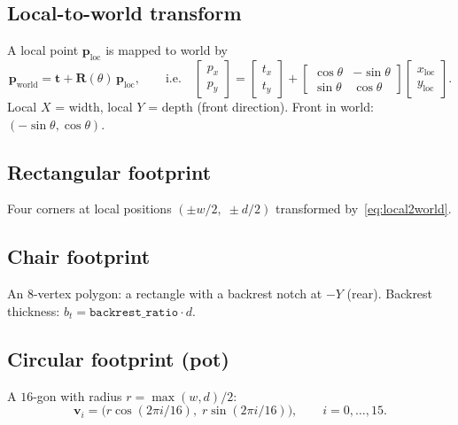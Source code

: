 \documentclass[a4paper, 11pt]{article}
\newcommand{\vect}[1]{\bm{#1}}
\newcommand{\mat}[1]{\bm{#1}}
\begin{document}
\subsection{Local-to-world transform}

A local point $\vect{p}_{\text{loc}}$ is mapped to world by
\begin{equation}\label{eq:local2world}
  \vect{p}_{\text{world}}
  = \vect{t} + \mat{R}(\theta)\,\vect{p}_{\text{loc}},
  \qquad
  \text{i.e.}\quad
  \begin{bmatrix} p_x \\ p_y \end{bmatrix}
  =
  \begin{bmatrix} t_x \\ t_y \end{bmatrix}
  +
  \begin{bmatrix}
    \cos\theta & -\sin\theta \\
    \sin\theta &  \cos\theta
  \end{bmatrix}
  \begin{bmatrix} x_{\text{loc}} \\ y_{\text{loc}} \end{bmatrix}.
\end{equation}
Local $X$ = width, local $Y$ = depth (front direction).
Front in world: $(-\sin\theta, \cos\theta)$.

\subsection{Rectangular footprint}

Four corners at local positions $(\pm w/2,\; \pm d/2)$ transformed
by~\eqref{eq:local2world}.

\subsection{Chair footprint}

An $8$-vertex polygon: a rectangle with a backrest notch at $-Y$ (rear).
Backrest thickness: $b_t = \texttt{backrest\_ratio} \cdot d$.

\subsection{Circular footprint (pot)}

A $16$-gon with radius $r = \max(w, d)/2$:
\begin{equation}
  \vect{v}_i
  = \bigl(r\cos(2\pi i/16),\; r\sin(2\pi i/16)\bigr),
  \qquad i = 0, \ldots, 15.
\end{equation}
\end{document}
